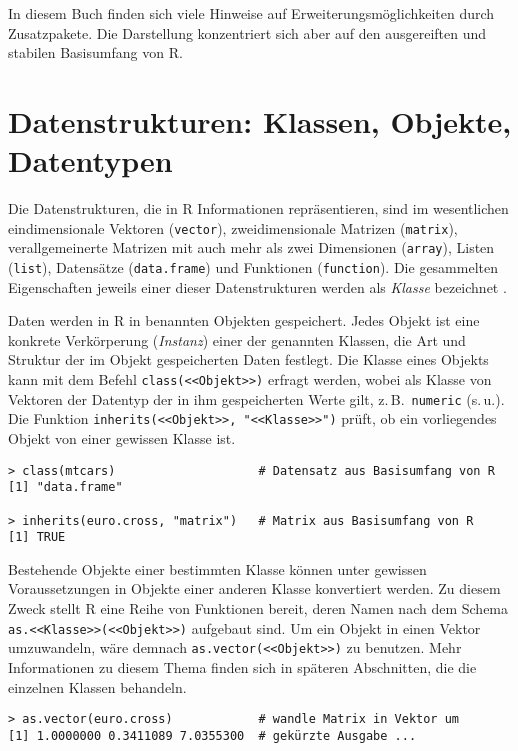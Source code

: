 In diesem Buch finden sich viele Hinweise auf Erweiterungsmöglichkeiten durch Zusatzpakete. Die Darstellung konzentriert sich aber auf den ausgereiften und stabilen Basisumfang von R.

\section{Datenstrukturen: Klassen, Objekte, Datentypen}
\label{sec:objects}

Die Datenstrukturen, die in R Informationen repräsentieren, sind im wesentlichen eindimensionale Vektoren (\lstinline!vector!), zweidimensionale Matrizen (\lstinline!matrix!), verallgemeinerte Matrizen mit auch mehr als zwei Dimensionen (\lstinline!array!), Listen (\lstinline!list!), Datensätze (\lstinline!data.frame!) und Funktionen (\lstinline!function!). Die gesammelten Eigenschaften jeweils einer dieser Datenstrukturen werden als \emph{Klasse} bezeichnet \cite{Chambers2008, Wickham2014a}.

Daten werden in R in benannten Objekten gespeichert. Jedes Objekt ist eine konkrete Verkörperung (\emph{Instanz}) einer der genannten Klassen, die Art und Struktur der im Objekt gespeicherten Daten festlegt. Die Klasse eines Objekts kann mit dem Befehl \lstinline!class(<<Objekt>>)! erfragt werden, wobei als Klasse von Vektoren der Datentyp der in ihm gespeicherten Werte gilt, z.\,B.\ \lstinline!numeric! (s.\,u.). Die Funktion  \lstinline!inherits(<<Objekt>>, "<<Klasse>>")! prüft, ob ein vorliegendes Objekt von einer gewissen Klasse ist.
\begin{lstlisting}
> class(mtcars)                    # Datensatz aus Basisumfang von R
[1] "data.frame"

> inherits(euro.cross, "matrix")   # Matrix aus Basisumfang von R
[1] TRUE
\end{lstlisting}

Bestehende Objekte einer bestimmten Klasse können unter gewissen Voraussetzungen in Objekte einer anderen Klasse konvertiert werden. Zu diesem Zweck stellt R eine Reihe von Funktionen bereit, deren Namen nach dem Schema  \lstinline!as.<<Klasse>>(<<Objekt>>)! aufgebaut sind. Um ein Objekt in einen Vektor umzuwandeln, wäre demnach \lstinline!as.vector(<<Objekt>>)! zu benutzen. Mehr Informationen zu diesem Thema finden sich in späteren Abschnitten, die die einzelnen Klassen behandeln.
\begin{lstlisting}
> as.vector(euro.cross)            # wandle Matrix in Vektor um
[1] 1.0000000 0.3411089 7.0355300  # gekürzte Ausgabe ...
\end{lstlisting}

